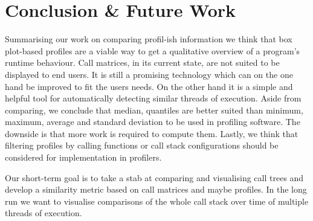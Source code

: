 \documentclass[b5paper, final, hauptseminar]{zih-template}
\newcommand*\cleartooddpage{
	\clearpage
	\ifthenelse{\isodd{\thepage}}
		{}
		{\newpage \mbox{} \clearpage}
}
\begin{document}
\cleartooddpage
\section{Conclusion \& Future Work}
Summarising our work on comparing profil-ish information we think that box plot-based profiles are a viable way to get a qualitative overview of a program's runtime behaviour.
Call matrices, in its current state, are not suited to be displayed to end users.
It is still a promising technology which can on the one hand be improved to fit the users needs.
On the other hand it is a simple and helpful tool for automatically detecting similar threads of execution.
Aside from comparing, we conclude that median, quantiles are better suited than minimum, maximum, average and standard deviation to be used in profiling software. The downside is that more work is required to compute them.
Lastly, we think that filtering profiles by calling functions or call stack configurations should be considered for implementation in profilers.

Our short-term goal is to take a stab at comparing and visualising call trees and develop a similarity metric based on call matrices and maybe profiles.
In the long run we want to visualise comparisons of the whole call stack over time of multiple threads of execution.

\end{document}
